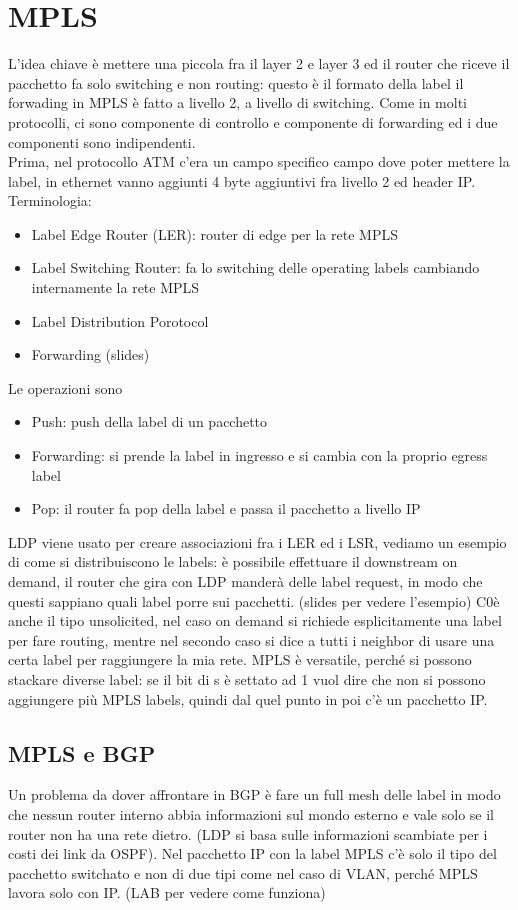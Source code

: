 \documentclass[12pt, oneside]{extbook} %
\begin{document}
\section{MPLS}
L'idea chiave è mettere una piccola fra il layer 2 e layer 3 ed il router che riceve il pacchetto fa solo switching e non routing: questo è il formato della label
il forwading in MPLS è fatto a livello 2, a livello di switching. Come in molti protocolli, ci sono componente di controllo e componente di forwarding ed i due componenti sono indipendenti.\\Prima, nel protocollo ATM c'era un campo specifico campo dove poter mettere la label, in ethernet vanno aggiunti 4 byte aggiuntivi fra livello 2 ed header IP. Terminologia:
\begin{itemize}
\item Label Edge Router (LER): router di edge per la rete MPLS
\item Label Switching Router: fa lo switching delle operating labels cambiando internamente la rete MPLS  
\item Label Distribution Porotocol
\item Forwarding (slides)
\end{itemize}
Le operazioni sono
\begin{itemize}
\item Push: push della label di un pacchetto
\item Forwarding: si prende la label in ingresso e si cambia con la proprio egress label
\item Pop: il router fa pop della label e passa il pacchetto a livello IP
\end{itemize}
LDP viene usato per creare associazioni fra i LER ed i LSR, vediamo un esempio di come si distribuiscono le labels: è possibile effettuare il downstream on demand, il router che gira con LDP manderà delle label request, in modo che questi sappiano quali label porre sui pacchetti. (slides per vedere l'esempio) C0è anche il tipo unsolicited, nel caso on demand si richiede esplicitamente una label per fare routing, mentre nel secondo caso si dice a tutti i neighbor di usare una certa label per raggiungere la mia rete. MPLS è versatile, perché si possono stackare diverse label: se il bit di s è settato ad 1 vuol dire che non si possono aggiungere più MPLS labels, quindi dal quel punto in poi c'è un pacchetto IP.
\subsection{MPLS e BGP}
Un problema da dover affrontare in BGP è fare un full mesh delle label in modo che nessun router interno abbia informazioni sul mondo esterno e vale solo se il router non ha una rete dietro. (LDP si basa sulle informazioni scambiate per i costi dei link da OSPF). Nel pacchetto IP con la label MPLS c'è solo il tipo del pacchetto switchato e non di due tipi come nel caso di VLAN, perché MPLS lavora solo con IP. (LAB per vedere come funziona)
\end{document}
